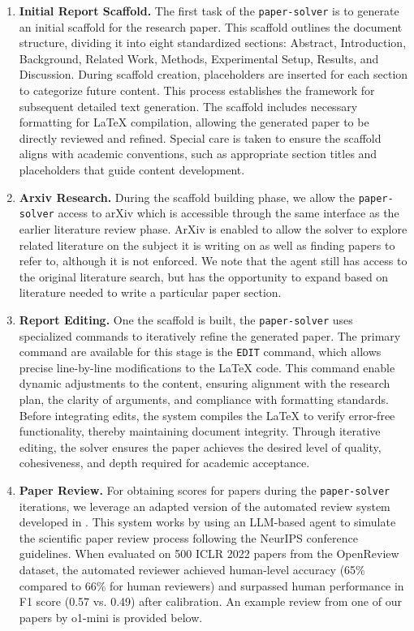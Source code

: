 \documentclass[11pt, a4paper]{gdm_format}
\begin{document}
\begin{enumerate}
    \item [A.] \textbf{Initial Report Scaffold.} The first task of the \texttt{paper-solver} is to generate an initial scaffold for the research paper. This scaffold outlines the document structure, dividing it into eight standardized sections: Abstract, Introduction, Background, Related Work, Methods, Experimental Setup, Results, and Discussion. During scaffold creation, placeholders are inserted for each section to categorize future content. This process establishes the framework for subsequent detailed text generation. The scaffold includes necessary formatting for LaTeX compilation, allowing the generated paper to be directly reviewed and refined. Special care is taken to ensure the scaffold aligns with academic conventions, such as appropriate section titles and placeholders that guide content development.
    \item [B.] \textbf{Arxiv Research.} During the scaffold building phase, we allow the \texttt{paper-solver} access to arXiv which is accessible through the same interface as the earlier literature review phase. ArXiv is enabled to allow the solver to explore related literature on the subject it is writing on as well as finding papers to refer to, although it is not enforced. We note that the agent still has access to the original literature search, but has the opportunity to expand based on literature needed to write a particular paper section.
    \item [C.] \textbf{Report Editing.} One the scaffold is built, the \texttt{paper-solver} uses specialized commands to iteratively refine the generated paper. The primary command are available for this stage is the \texttt{EDIT} command, which allows precise line-by-line modifications to the LaTeX code. This command enable dynamic adjustments to the content, ensuring alignment with the research plan, the clarity of arguments, and compliance with formatting standards. Before integrating edits, the system compiles the LaTeX to verify error-free functionality, thereby maintaining document integrity. Through iterative editing, the solver ensures the paper achieves the desired level of quality, cohesiveness, and depth required for academic acceptance. 
    \item [D.] \textbf{Paper Review.} For obtaining scores for papers during the \texttt{paper-solver} iterations, we leverage an adapted version of the automated review system developed in \cite{lu2024aiscientist}. This system works by using an LLM-based agent to simulate the scientific paper review process following the NeurIPS conference guidelines.
    When evaluated on 500 ICLR 2022 papers from the OpenReview dataset, the automated reviewer achieved human-level accuracy (65\% compared to 66\% for human reviewers) and surpassed human performance in F1 score (0.57 vs. 0.49) after calibration. 
    An example review from one of our papers by o1-mini is provided below.
\end{enumerate}
\end{document}
